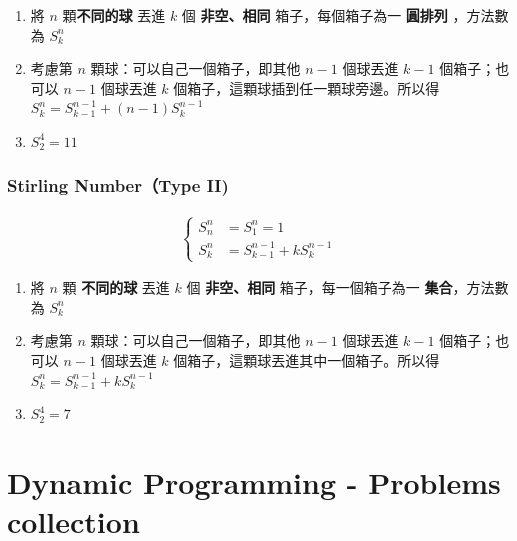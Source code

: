 \documentclass[10pt,oneside]{article}
\begin{document}
\begin{landscape}
\begin{multicols}{2}
{\begin{enumerate}
	\item 將 $n$ 顆\textbf{不同的球} 丟進 $k$ 個 \textbf{非空、相同} 箱子，每個箱子為一 \textbf{圓排列} ，方法數為 $S^n_k$
	\item 考慮第 $n$ 顆球：可以自己一個箱子，即其他 $n-1$ 個球丟進 $k-1$ 個箱子；也可以 $n-1$ 個球丟進 $k$ 個箱子，這顆球插到任一顆球旁邊。所以得 $S^n_k = S^{n-1}_{k-1} + (n-1) S^{n-1}_{k}$
	\item $S^4_2 = 11$
\end{enumerate}
}

\subsubsection{Stirling Number（Type II)}
{\normalsize
\begin{equation}
\begin{split}
\begin{cases}
	S^n_n &= S^n_1 = 1 \\
    	S^n_k &= S^{n-1}_{k-1} + k S^{n-1}_{k}
\end{cases}
\end{split}
\end{equation}

\begin{enumerate}
	\item 將 $n$ 顆 \textbf{不同的球} 丟進 $k$ 個 \textbf{非空、相同} 箱子，每一個箱子為一 \textbf{集合}，方法數為 $S^n_k$
	\item 考慮第 $n$ 顆球：可以自己一個箱子，即其他 $n-1$ 個球丟進 $k-1$ 個箱子；也可以 $n-1$ 個球丟進 $k$ 個箱子，這顆球丟進其中一個箱子。所以得 $S^n_k = S^{n-1}_{k-1} + k S^{n-1}_{k}$
	\item $S^4_2 = 7$
\end{enumerate}
}


\section{Dynamic Programming - Problems collection}

\columnbreak
{}

% 

\end{multicols}
\end{landscape}
\end{document}

